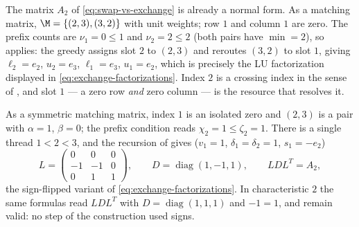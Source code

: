\begin{example}\label{ex:exchange}
  The matrix $A_2$ of \cref{eq:swap-vs-exchange} is already a normal form.
  As a matching matrix, $\M = \{(2,3), (3,2)\}$ with unit weights; row $1$
  and column $1$ are zero.  The prefix counts are $\nu_1 = 0 \le 1$ and
  $\nu_2 = 2 \le 2$ (both pairs have $\min = 2$), so 
  applies: the greedy assigns slot $2$ to $(2,3)$ and reroutes $(3,2)$ to
  slot $1$, giving $\ell_2 = e_2$, $u_2 = e_3$, $\ell_1 = e_3$,
  $u_1 = e_2$, which is precisely the LU factorization displayed in
  \cref{eq:exchange-factorizations}.  Index $2$ is a crossing index in the
  sense of , and slot $1$ --- a zero row \emph{and}
  zero column --- is the resource that resolves it.

  As a symmetric matching matrix, index $1$ is an isolated zero and
  $(2,3)$ is a pair with $\alpha = 1$, $\beta = 0$; the prefix condition
  reads $\chi_2 = 1 \le \zeta_2 = 1$.  There is a single thread
  $1 < 2 < 3$, and the recursion of  gives
  ($v_1 = 1$, $\delta_1 = \delta_2 = 1$, $s_1 = -e_2$)
  \[
    L =
    \begin{pmatrix}
      0 & 0 & 0\\
      -1 & -1 & 0\\
      0 & 1 & 1
    \end{pmatrix},
    \qquad
    D = \operatorname{diag}(1, -1, 1),
    \qquad
    L D L^T = A_2 ,
  \]
  the sign-flipped variant of \cref{eq:exchange-factorizations}.  In
  characteristic $2$ the same formulas read $L D L^T$ with
  $D = \operatorname{diag}(1,1,1)$ and $-1 = 1$, and remain valid: no step
  of the construction used signs.
\end{example}

